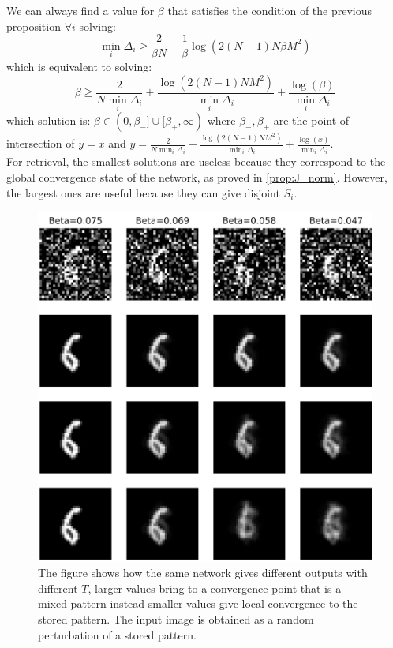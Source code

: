 \begin{remark}
	We can always find a value for $\beta$ that satisfies the condition of the previous proposition $\forall i$  solving:
	\[
	\min_i \Delta_i \geq \frac{2}{\beta N} + \frac{1}{\beta} \log(2(N-1)N \beta M^2)
	\]
	which is equivalent to solving:
	\[
	\beta \geq \frac{2}{N \min_i \Delta_i }+\frac{\log(2(N-1)N M^2)}{\min_i \Delta_i} +\frac{ \log(\beta)}{ \min_i \Delta_i}
	\]
	which solution is: $\beta \in (0,\beta_-] \cup [\beta_+,\infty)$ where $\beta_-,\beta_+$ are the point of \\intersection of $y=x$ and $y=\frac{2}{N \min_i \Delta_i }+\frac{\log(2(N-1)N M^2)}{\min_i \Delta_i} +\frac{ \log(x)}{ \min_i \Delta_i}$. \\
	For retrieval, the smallest solutions are useless because they correspond to the global convergence state of the network, as proved in \cref{prop:J_norm}. However, the largest ones are useful because they can give disjoint $S_i$.
\end{remark}

\begin{figure}[ht]
    \centering
    \includegraphics[width=0.6\linewidth]{Figures/FCHopfield.png}
    \caption{The figure shows how the same network gives different outputs with different $T$, larger values bring to a convergence point that is a mixed pattern instead smaller values give local convergence to the stored pattern. The input image is obtained as a random perturbation of a stored pattern.}
\end{figure}

